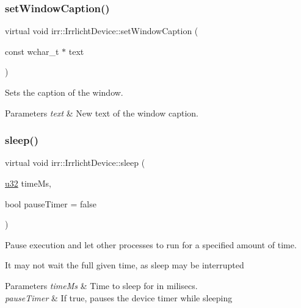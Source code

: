 \subsubsection{\texorpdfstring{set\+Window\+Caption()}{setWindowCaption()}\hspace{0.1cm}{\footnotesize\ttfamily [2/2]}}
{\footnotesize\ttfamily virtual void irr\+::\+Irrlicht\+Device\+::set\+Window\+Caption (\begin{DoxyParamCaption}\item[{const wchar\+\_\+t $\ast$}]{text }\end{DoxyParamCaption})\hspace{0.3cm}{\ttfamily [pure virtual]}}



Sets the caption of the window. 


\begin{DoxyParams}{Parameters}
{\em text} & New text of the window caption. \\
\hline
\end{DoxyParams}
\mbox{\label{classirr_1_1IrrlichtDevice_a89a3ecebc0e7c5ae08617b78a6e8a9f7}} 
\subsubsection{\texorpdfstring{sleep()}{sleep()}\hspace{0.1cm}{\footnotesize\ttfamily [1/2]}}
{\footnotesize\ttfamily virtual void irr\+::\+Irrlicht\+Device\+::sleep (\begin{DoxyParamCaption}\item[{\hyperlink{namespaceirr_a0416a53257075833e7002efd0a18e804}{u32}}]{time\+Ms,  }\item[{bool}]{pause\+Timer = {\ttfamily false} }\end{DoxyParamCaption})\hspace{0.3cm}{\ttfamily [pure virtual]}}



Pause execution and let other processes to run for a specified amount of time. 

It may not wait the full given time, as sleep may be interrupted 
\begin{DoxyParams}{Parameters}
{\em time\+Ms} & Time to sleep for in milisecs. \\
\hline
{\em pause\+Timer} & If true, pauses the device timer while sleeping \\
\hline
\end{DoxyParams}
\mbox{\label{classirr_1_1IrrlichtDevice_a89a3ecebc0e7c5ae08617b78a6e8a9f7}} 
